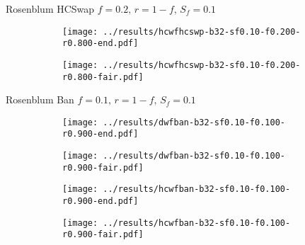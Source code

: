 \documentclass[10pt,a4paper]{beamer}
\begin{document}
	\begin{frame}{Rosenblum HCSwap $f=0.2,\, r=1-f,\,S_f=0.1$}
		\begin{figure}
			\begin{subfigure}{.48\textwidth}
				\centering
				\texttt{[image: ../results/hcwfhcswp-b32-sf0.10-f0.200-r0.800-end.pdf]}
			\end{subfigure}
			\begin{subfigure}{.48\textwidth}
				\centering
				\texttt{[image: ../results/hcwfhcswp-b32-sf0.10-f0.200-r0.800-fair.pdf]}
			\end{subfigure}
		\end{figure}
	\end{frame}
	
	
	
	
	\begin{frame}{Rosenblum Ban $f=0.1,\, r=1-f,\,S_f=0.1$}
		\begin{figure}
			\begin{subfigure}{.48\textwidth}
				\centering
				\texttt{[image: ../results/dwfban-b32-sf0.10-f0.100-r0.900-end.pdf]}
			\end{subfigure}
			\begin{subfigure}{.48\textwidth}
				\centering
				\texttt{[image: ../results/dwfban-b32-sf0.10-f0.100-r0.900-fair.pdf]}
			\end{subfigure}
		\end{figure}
		
		\begin{figure}
			\begin{subfigure}{.48\textwidth}
				\centering
				\texttt{[image: ../results/hcwfban-b32-sf0.10-f0.100-r0.900-end.pdf]}
			\end{subfigure}
			\begin{subfigure}{.48\textwidth}
				\centering
				\texttt{[image: ../results/hcwfban-b32-sf0.10-f0.100-r0.900-fair.pdf]}
			\end{subfigure}
		\end{figure}
	\end{frame}
	
\end{document}
